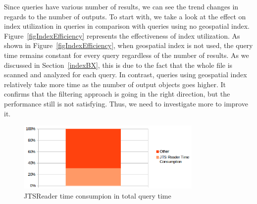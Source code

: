 \documentclass[a4paper,12pt]{article}
\begin{document}
Since queries have various number of results, we can see the trend changes in regards to the number of outputs.
To start with, we take a look at the effect on index utilization in queries in comparison with queries using no geospatial index. Figure~\ref{figIndexEfficiency} represents the effectiveness of index utilization.
As shown in Figure~\ref{figIndexEfficiency}, when geospatial index is not used, the query time remains constant for every query regardless of the number of results. As we discussed in Section~\ref{indexBX}, this is due to the fact that the whole file is scanned and analyzed for each query. In contrast, queries using geospatial index relatively take more time as the number of output objects goes higher. It confirms that the filtering approach is going in the right direction, but the performance still is not satisfying. Thus, we need to investigate more to improve it.
\begin{figure}
\centering
\includegraphics[width=0.8\textwidth]{JTSReadetTimeConsumption}
\caption{JTSReader time consumpion in total query time}
\label{figJTSReaderTime}
\end{figure}
\end{document}
